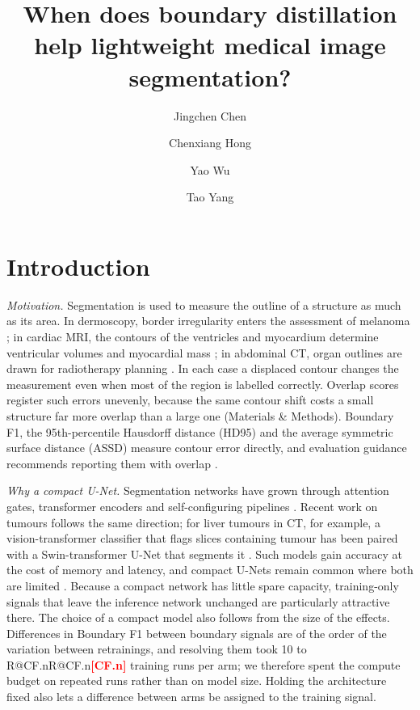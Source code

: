 \documentclass[fleqn,10pt,lineno]{wlpeerj}
\title{When does boundary distillation help lightweight medical image segmentation?}
\author[1]{Jingchen Chen}
\author[1]{Chenxiang Hong}
\author[1]{Yao Wu}
\author[1]{Tao Yang}
\affil[1]{Future Technology School, Shenzhen Technology University, Shenzhen, Guangdong, China}
\makeatletter
\newcommand{\R}[1]{\ifcsname R@#1\endcsname\csname R@#1\endcsname\else\textbf{\textcolor{red}{[#1]}}\fi}
\makeatother
\begin{document}
\flushbottom
\maketitle
\thispagestyle{empty}

\section*{Introduction}

\emph{Motivation.} Segmentation is used to measure the outline of a structure as much as its area. In dermoscopy, border irregularity enters the assessment of melanoma \citep{Nachbar1994ABCD}; in cardiac MRI, the contours of the ventricles and myocardium determine ventricular volumes and myocardial mass \citep{Bernard2018Deep}; in abdominal CT, organ outlines are drawn for radiotherapy planning \citep{Jabbour2014Upper}. In each case a displaced contour changes the measurement even when most of the region is labelled correctly. Overlap scores register such errors unevenly, because the same contour shift costs a small structure far more overlap than a large one (Materials \& Methods). Boundary F1, the 95th-percentile Hausdorff distance (HD95) \citep{Huttenlocher1993Comparing} and the average symmetric surface distance (ASSD) measure contour error directly, and evaluation guidance recommends reporting them with overlap \citep{Taha2015Metrics, Maier-Hein2024Metrics}.

\emph{Why a compact U-Net.} Segmentation networks have grown through attention gates, transformer encoders and self-configuring pipelines \citep{Oktay2018Attention, Chen2021TransUNet, Cao2022SwinUnet, Isensee2021nnUNet}. Recent work on tumours follows the same direction; for liver tumours in CT, for example, a vision-transformer classifier that flags slices containing tumour has been paired with a Swin-transformer U-Net that segments it \citep{Raj2026ViTSwinUNet}. Such models gain accuracy at the cost of memory and latency, and compact U-Nets remain common where both are limited \citep{Ruan2023EGEUNet, Jiang2024LVUNet}. Because a compact network has little spare capacity, training-only signals that leave the inference network unchanged are particularly attractive there. The choice of a compact model also follows from the size of the effects. Differences in Boundary F1 between boundary signals are of the order of the variation between retrainings, and resolving them took 10 to \R{CF.n} training runs per arm; we therefore spent the compute budget on repeated runs rather than on model size. Holding the architecture fixed also lets a difference between arms be assigned to the training signal.
\end{document}
